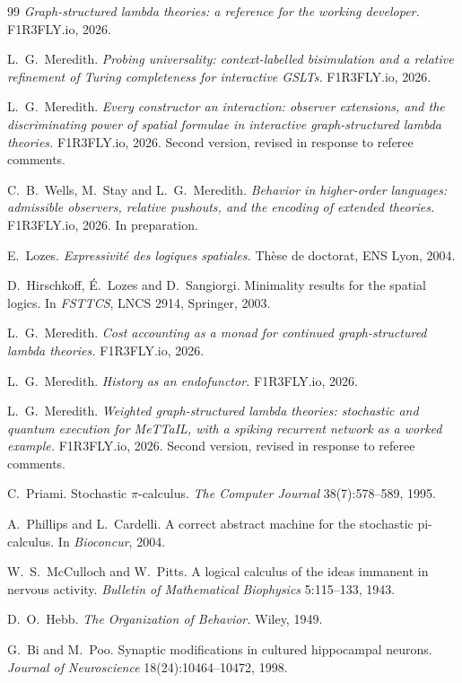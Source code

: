 \begin{thebibliography}{99}
\emph{Graph-structured lambda theories: a reference for the working developer.} F1R3FLY.io, 2026.

L.\ G.\ Meredith. \emph{Probing universality: context-labelled bisimulation and a relative refinement of Turing completeness for interactive GSLTs.} F1R3FLY.io, 2026.

L.\ G.\ Meredith. \emph{Every constructor an interaction: observer extensions, and the discriminating
power of spatial formulae in interactive graph-structured lambda theories.} F1R3FLY.io, 2026. Second
version, revised in response to referee comments.

C.\ B.\ Wells, M.\ Stay and L.\ G.\ Meredith. \emph{Behavior in higher-order languages: admissible
observers, relative pushouts, and the encoding of extended theories.} F1R3FLY.io, 2026. In preparation.

E.\ Lozes. \emph{Expressivit\'e des logiques spatiales.} Th\`ese de doctorat, ENS Lyon, 2004.

D.\ Hirschkoff, \'E.\ Lozes and D.\ Sangiorgi. Minimality results for the spatial logics. In
\emph{FSTTCS}, LNCS 2914, Springer, 2003.

L.\ G.\ Meredith. \emph{Cost accounting as a monad for continued graph-structured lambda theories.} F1R3FLY.io, 2026.

L.\ G.\ Meredith. \emph{History as an endofunctor.} F1R3FLY.io, 2026.

L.\ G.\ Meredith. \emph{Weighted graph-structured lambda theories: stochastic and quantum execution for MeTTaIL, with a spiking recurrent network as a worked example.} F1R3FLY.io, 2026. Second version, revised in response to referee comments.

C.\ Priami. Stochastic $\pi$-calculus. \emph{The Computer Journal} 38(7):578--589, 1995.

A.\ Phillips and L.\ Cardelli. A correct abstract machine for the stochastic pi-calculus. In \emph{Bioconcur}, 2004.

W.\ S.\ McCulloch and W.\ Pitts. A logical calculus of the ideas immanent in nervous activity. \emph{Bulletin of Mathematical Biophysics} 5:115--133, 1943.

D.\ O.\ Hebb. \emph{The Organization of Behavior.} Wiley, 1949.

G.\ Bi and M.\ Poo. Synaptic modifications in cultured hippocampal neurons. \emph{Journal of Neuroscience} 18(24):10464--10472, 1998.


\end{thebibliography}
